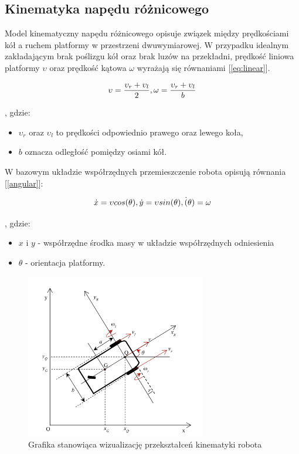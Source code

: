 \subsection{Kinematyka napędu różnicowego}

Model kinematyczny napędu różnicowego opisuje związek między prędkościami kół a ruchem platformy w przestrzeni dwuwymiarowej. W przypadku idealnym zakładającym brak poślizgu kół oraz brak luzów na przekładni, prędkość liniowa platformy \(\upsilon\) oraz prędkość kątowa \(\omega\) wyrażają się równaniami [\ref{eq:linear}].

\begin{equation}
    \centering
    \upsilon = \frac{\upsilon_r + \upsilon_l}{2},  \omega = \frac{\upsilon_r + \upsilon_l}{b}
    \label{eq:linear}
\end{equation}

, gdzie:
\begin{itemize}
    \item \(\upsilon_r\) oraz \(\upsilon_l\) to prędkości odpowiednio prawego oraz lewego koła,
    \item \(b\) oznacza odległość pomiędzy osiami kół.
\end{itemize}

W bazowym układzie współrzędnych przemieszczenie robota opisują równania [\ref{angular}]:

\begin{equation}
    \centering
    \dot{x} = \upsilon cos(\theta), \dot{y} = \upsilon sin(\theta), \dot(\theta) = \omega
    \label{eq:angular}
\end{equation}

, gdzie:
\begin{itemize}
    \item \(x\) i \(y\) - współrzędne środka masy w układzie współrzędnych odniesienia
    \item \(\theta\) - orientacja platformy.
\end{itemize}

\clearpage

\begin{figure}[h!]
    \centering
    \includegraphics[width=0.7\textwidth]{./graf/diff-drive.png}
    \caption{Grafika stanowiąca wizualizację przekształceń kinematyki robota \cite{bib:konferencja}}
\end{figure}

